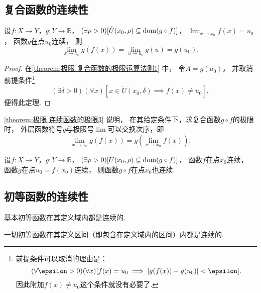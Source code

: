 \subsection{复合函数的连续性}
\begin{theorem}\label{theorem:极限.连续函数的极限3}
设\(f\colon X \to Y\)，\(g\colon Y\to\mathbb{R}\)，
\((\exists\rho>0)[\mathring{U}(x_0,\rho) \subseteq \operatorname{dom}(g \circ f)]\)，
\(\lim_{x \to x_0} f(x) = u_0\)，
函数\(g\)在点\(u_0\)连续，
则\[
	\lim_{x \to x_0} g(f(x))
	= \lim_{u \to u_0} g(u)
	= g(u_0).
\]
\begin{proof}
在\cref{theorem:极限.复合函数的极限运算法则1} 中，
令\(A = g(u_0)\)，
并取消前提条件\footnote{前提条件可以取消的理由是：\[
	(\forall\epsilon>0)
	(\forall x)
	[
		f(x) = u_0
		\implies
		\abs{g(f(x)) - g(u_0)} < \epsilon
	].
\]
因此附加\(f(x) \neq u_0\)这个条件就没有必要了.}\[
	(\exists\delta>0)(\forall x)[x\in\mathring{U}(x_0,\delta) \implies f(x)\neq u_0],
\]
便得此定理.
\end{proof}
\end{theorem}
\begin{remark}
\cref{theorem:极限.连续函数的极限3} 说明，
在其给定条件下，求复合函数\(g \circ f\)的极限时，
外层函数符号\(g\)与极限号\(\lim\)可以交换次序，即\[
	\lim_{x \to x_0} g(f(x))
	= g\left(\lim_{x \to x_0} f(x)\right).
\]
\end{remark}

\begin{theorem}\label{theorem:极限.连续函数的极限4}
设\(f\colon X \to Y\)，\(g\colon Y\to\mathbb{R}\)，
\((\exists\rho>0)[U(x_0,\rho) \subseteq \operatorname{dom}(g \circ f)]\)，
函数\(f\)在点\(x_0\)连续，
函数\(g\)在点\(u_0 = f(x_0)\)连续，
则函数\(g \circ f\)在点\(x_0\)也连续.
\end{theorem}

\subsection{初等函数的连续性}
\begin{theorem}
基本初等函数在其定义域内都是连续的.
\end{theorem}

\begin{corollary}
一切初等函数在其定义区间（即包含在定义域内的区间）内都是连续的.
\end{corollary}

